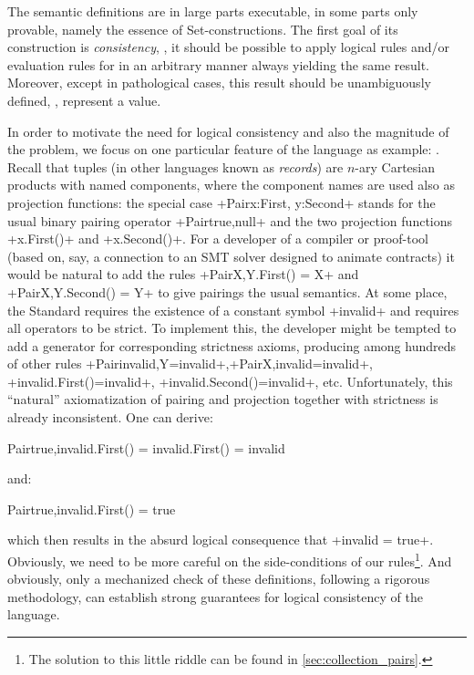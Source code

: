 The semantic definitions are in large parts executable, in some parts
only provable, namely the essence of Set-constructions. The first goal
of its construction is \emph{consistency}, \ie, it should be possible
to apply logical rules and/or evaluation rules for \OCL in an
arbitrary manner always yielding the same result. Moreover, except in
pathological cases, this result should be unambiguously defined, \ie,
represent a value.

In order to motivate the need for logical consistency and also the
magnitude of the problem, we focus on one particular feature of the
language as example: . Recall that tuples (in other
languages known as \emph{records}) are $n$-ary Cartesian products with
named components, where the component names are used also as
projection functions: the special case %
\inlineocl+Pair{x:First, y:Second}+ stands for the usual binary
pairing operator \inlineocl+Pair{true,null}+ and the two projection
functions \inlineocl+x.First()+ and \inlineocl+x.Second()+. For a
developer of a compiler or proof-tool (based on, say, a connection to
an SMT solver designed to animate \OCL contracts) it would be natural
to add the rules \inlineocl+Pair{X,Y}.First() = X+ and
\inlineocl+Pair{X,Y}.Second() = Y+ to give pairings the usual
semantics. At some place, the \OCL Standard requires the existence of
a constant symbol \inlineocl+invalid+ and requires all operators to be
strict. To implement this, the developer might be tempted to add a
generator for corresponding strictness axioms, producing among
hundreds of other rules
\inlineocl+Pair{invalid,Y}=invalid+,\inlineocl+Pair{X,invalid}=invalid+,
\inlineocl+invalid.First()=invalid+,
\inlineocl+invalid.Second()=invalid+, etc.  Unfortunately, this
``natural'' axiomatization of pairing and projection together with
strictness is already inconsistent. One can derive:
\begin{ocl}
   Pair{true,invalid}.First() = invalid.First() = invalid
\end{ocl}
and:
\begin{ocl}
   Pair{true,invalid}.First() = true
\end{ocl}
which then results in the absurd logical consequence that
\inlineocl+invalid = true+. Obviously, we need to be more careful on
the side-conditions of our rules\footnote{The solution to this little
  riddle can be found in \autoref{sec:collection_pairs}.}. And
obviously, only a mechanized check of these definitions, following a
rigorous methodology, can establish strong guarantees for logical
consistency of the \OCL language.

